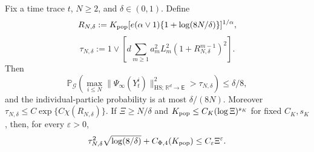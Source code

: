 \begin{lemma}
\label{lem:weighted-feature-max-event}
Fix a time trace $t$, $N\ge2$, and $\delta\in(0,1)$. Define
\[
 R_{N,\delta}:=K_{\rm pop}
   [e(\alpha\vee1)\{1+\log(8N/\delta)\}]^{1/\alpha},
\]
\begin{equation}
\label{eq:weighted-feature-max-tau-N-delta}
 \tau_{N,\delta}:=1\vee
   \left[d\sum_{m\ge1}a_m^2L_m^2(1+R_{N,\delta}^{m-1})^2\right].
\end{equation}
Then
\begin{equation}
\label{eq:weighted-feature-max-event}
 \mathbb P_{\mathcal G}\left(
   \max_{i\le N}\|\Psi_\infty(Y_t^i)\|_{\mathrm{HS};\,\mathbb R^d\to\mathsf E}^2>\tau_{N,\delta}
                         \right)\le\delta/8,
\end{equation}
and the individual-particle probability is at most $\delta/(8N)$.
Moreover $\tau_{N,\delta}\le C\exp\{C\chi(R_{N,\delta})\}$.
If $\Xi\ge N/\delta$ and $K_{\rm pop}\le C_K(\log\Xi)^{s_K}$ for fixed
$C_K,s_K$, then, for every $\varepsilon>0$,
\begin{equation}
\label{eq:weighted-envelope-subpolynomial}
 \tau_{N,\delta}^2\sqrt{\log(8/\delta)}
       +C_{\Phi,4}(K_{\rm pop})\le C_\varepsilon \Xi^\varepsilon.
\end{equation}
\end{lemma}
